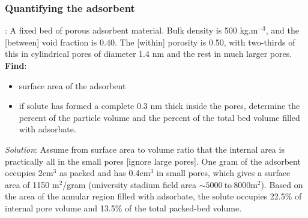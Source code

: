 \begin{frame}\frametitle{Quantifying the adsorbent}
	: A fixed bed of porous adsorbent material. Bulk density is 500 kg.m$^{-3}$, and the {\color{purple}{interparticle}} [between] void fraction is 0.40. The {\color{purple}{intraparticle}} [within] porosity is 0.50, with two-thirds of this in cylindrical pores of diameter 1.4 nm and the rest in much larger pores. \textbf{Find}:
	\begin{itemize}
		\item	surface area of the adsorbent
		\item	if solute has formed a complete {\color{purple}{monomolecular layer}} 0.3 nm thick inside the pores, determine the percent of the particle volume and the percent of the total bed volume filled with adsorbate.
	\end{itemize}
	
	\vspace{12pt}
	\emph{Solution}:
	Assume from surface area to volume ratio that the internal area is practically all in the small pores [ignore large pores]. 
	One gram of the adsorbent occupies 2cm$^3$ as packed and has 0.4cm$^3$ in small pores, which gives a surface area of 1150 m$^2$/gram {\scriptsize (university stadium field area $\sim 5000~\text{to}~8000 \text{m}^2$)}. 
	Based on the area of the annular region filled with adsorbate, the solute occupies 22.5\% of internal pore volume and 13.5\% of the total packed-bed volume.	
\end{frame}

